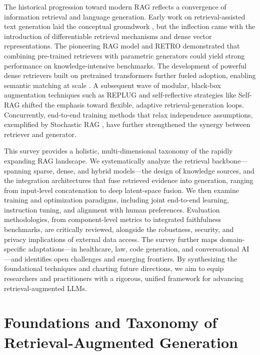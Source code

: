 \documentclass[11pt,a4paper]{article}
\begin{document}
The historical progression toward modern RAG reflects a convergence of information retrieval and language generation. Early work on retrieval-assisted text generation laid the conceptual groundwork \cite{arxiv:2202.01110v2}, but the inflection came with the introduction of differentiable retrieval mechanisms and dense vector representations. The pioneering RAG model \cite{arxiv:2005.11401v4} and RETRO \cite{arxiv:2112.04426v3} demonstrated that combining pre-trained retrievers with parametric generators could yield strong performance on knowledge-intensive benchmarks. The development of powerful dense retrievers built on pretrained transformers further fueled adoption, enabling semantic matching at scale \cite{arxiv:2211.14876v1}. A subsequent wave of modular, black-box augmentation techniques such as REPLUG \cite{arxiv:2301.12652v4} and self-reflective strategies like Self-RAG \cite{arxiv:2310.11511v1} shifted the emphasis toward flexible, adaptive retrieval-generation loops. Concurrently, end-to-end training methods that relax independence assumptions, exemplified by Stochastic RAG \cite{arxiv:2405.02816v1}, have further strengthened the synergy between retriever and generator.

This survey provides a holistic, multi-dimensional taxonomy of the rapidly expanding RAG landscape. We systematically analyze the retrieval backbone---spanning sparse, dense, and hybrid models---the design of knowledge sources, and the integration architectures that fuse retrieved evidence into generation, ranging from input-level concatenation to deep latent-space fusion. We then examine training and optimization paradigms, including joint end-to-end learning, instruction tuning, and alignment with human preferences. Evaluation methodologies, from component-level metrics to integrated faithfulness benchmarks, are critically reviewed, alongside the robustness, security, and privacy implications of external data access. The survey further maps domain-specific adaptations---in healthcare, law, code generation, and conversational AI---and identifies open challenges and emerging frontiers. By synthesizing the foundational techniques and charting future directions, we aim to equip researchers and practitioners with a rigorous, unified framework for advancing retrieval-augmented LLMs.


\section{Foundations and Taxonomy of Retrieval-Augmented Generation}
\end{document}
